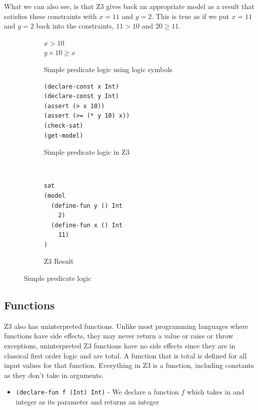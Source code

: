 \documentclass[a4paper]{report}
\begin{document}
What we can also see, is that Z3 gives back an appropriate model as a result that satisfies these constraints with $x = 11$ and $y = 2$. This is true as if we put $x = 11$ and $y = 2$ back into the constraints, $11 > 10$ and $20 \geq 11$.
\begin{figure}[!htb]
\centering
\begin{subfigure}[b]{\textwidth}
\centering
$x > 10$ \\
$y \times 10 \geq x$
\caption{Simple predicate logic using logic symbols}
\label{fig:Simple predicate logic using logic symbols}
\end{subfigure}
\begin{subfigure}[b]{\textwidth}
\lstset{numbers=left, showspaces=false,
    showstringspaces=false, tabsize=2, breaklines=true,
    xleftmargin=5.0ex,
}
\lstset{basicstyle=\ttfamily}
\centering
\begin{lstlisting}[frame=single]
(declare-const x Int)
(declare-const y Int)
(assert (> x 10))
(assert (>= (* y 10) x))
(check-sat)
(get-model)
\end{lstlisting}
\caption{Simple predicate logic in Z3}
\label{fig:Simple predicate logic in Z3}
\end{subfigure}\\
\begin{subfigure}[b]{\textwidth}
\lstset{basicstyle=\ttfamily}
\begin{lstlisting}[frame=single]
sat
(model 
  (define-fun y () Int
    2)
  (define-fun x () Int
    11)
)
\end{lstlisting}
\caption{Z3 Result}
\label{fig:Z3 Result}
\end{subfigure}
\caption{Simple predicate logic}
\label{fig:Simple predicate logic}
\end{figure}

\subsection{Functions}
Z3 also has uninterpreted functions. Unlike most programming languages where functions have side effects, they may never return a value or raise or throw exceptions, uninterpreted Z3 functions have no side effects since they are in classical first order logic and are total. A function that is total is defined for all input values for that function.
Everything in Z3 is a function, including constants as they don’t take in arguments.
\begin{itemize}
\item \texttt{(declare-fun f (Int) Int)} - We declare a function $f$ which takes in and integer as its parameter and returns an integer
\end{itemize}
\end{document}

